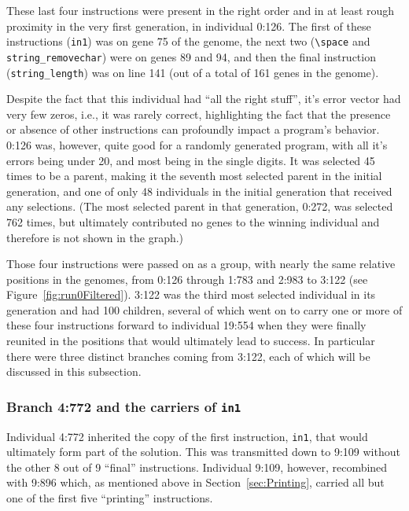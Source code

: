 These last four instructions were present in the right order and in at least
rough proximity in the very first generation, in individual 0:126. The first of these instructions (\texttt{in1}) was on gene 75 of the genome, the next two
(\texttt{\textbackslash space} and \texttt{string\_removechar}) were on 
genes 89 and 94, and then the final instruction (\texttt{string\_length}) 
was on line 141 (out of a total of 161 genes in the genome).

Despite the fact that this individual had ``all the right stuff'', it's error
vector had very few zeros, i.e., it was rarely correct, highlighting
the fact that the presence or absence of other instructions can profoundly
impact a program's behavior. 0:126 was, however, quite good for a randomly
generated program, with all it's errors being under 20, and most being in
the single digits. It was selected 45 times to be a parent, making it the
seventh most selected parent in the initial generation, and one of only 48
individuals in the initial generation that received any selections. 
(The most selected
parent in that generation, 0:272, was selected 762 times, but ultimately
contributed no genes to the winning individual and therefore is not shown in the graph.)

Those four instructions were passed on as a group, with nearly the same 
relative positions in the genomes, from 0:126 through 1:783 and 2:983 
to 3:122 (see Figure~\ref{fig:run0Filtered}). 
3:122 was the third most selected individual in its generation
and had 100 children, several of which went on to carry one or more of
these four instructions forward to individual 19:554 when they were finally
reunited in the positions that would ultimately lead to success. In particular
there were three distinct branches coming from 3:122, each of which will
be discussed in this subsection.

\subsubsection{Branch 4:772 and the carriers of \texttt{in1}}
\label{sec:4:772}

Individual 4:772 inherited the copy of the first instruction,
\texttt{in1}, that would ultimately form part of the solution. This was
transmitted down to 9:109 without the other 8 out of 9  ``final'' instructions. Individual 9:109, however, recombined with 
9:896 which, as mentioned above in Section~\ref{sec:Printing}, carried
all but one of the first five ``printing'' instructions. 

